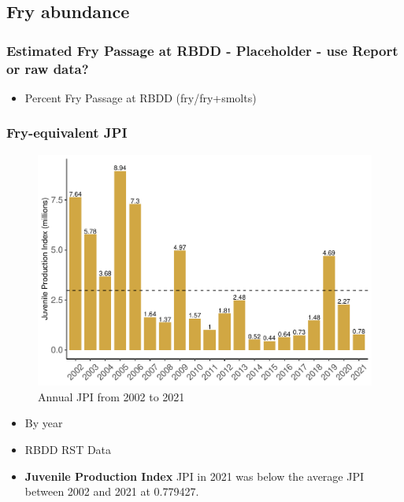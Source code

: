 \documentclass[
]{book}
\providecommand{\tightlist}{%
  \setlength{\itemsep}{0pt}\setlength{\parskip}{0pt}}
\theoremstyle{definition}
\theoremstyle{definition}
\theoremstyle{definition}
\theoremstyle{definition}
\theoremstyle{remark}
\begin{document}
\hypertarget{fry-abundance}{%
\subsection{Fry abundance}\label{fry-abundance}}

\hypertarget{estimated-fry-passage-at-rbdd---placeholder---use-report-or-raw-data}{%
\subsubsection{Estimated Fry Passage at RBDD - Placeholder - use Report or raw data?}\label{estimated-fry-passage-at-rbdd---placeholder---use-report-or-raw-data}}

\begin{itemize}
\tightlist
\item
  Percent Fry Passage at RBDD (fry/fry+smolts)
\end{itemize}

\hypertarget{fry-equivalent-jpi}{%
\subsubsection{Fry-equivalent JPI}\label{fry-equivalent-jpi}}

\begin{figure}
\centering
\includegraphics{_main_files/figure-latex/JPI-fig-1.pdf}
\caption{\label{fig:JPI-fig}Annual JPI from 2002 to 2021}
\end{figure}

\begin{itemize}
\item
  By year
\item
  RBDD RST Data
\item
  \textbf{Juvenile Production Index} JPI in 2021 was below the average JPI between 2002 and 2021 at 0.779427.
\end{itemize}
\end{document}
